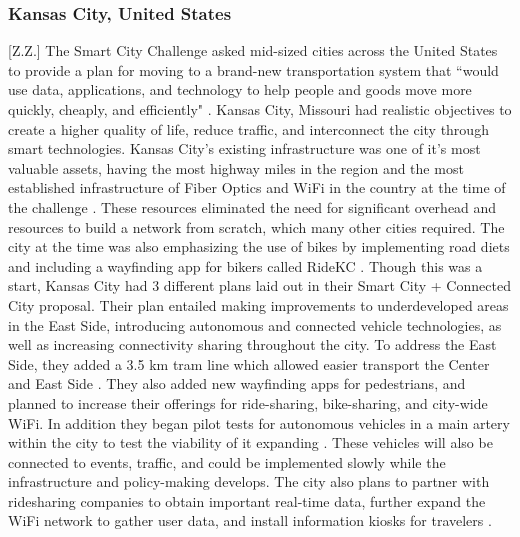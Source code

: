 \documentclass[12pt]{article}                       %
\begin{document}
\subsubsection{Kansas City, United States}[Z.Z.]
The Smart City Challenge asked mid-sized cities across the United States to provide a plan for moving to a brand-new transportation system that “would use data, applications, and technology to help people and goods move more quickly, cheaply, and efficiently" \cite{2016BeyondChallengeb}. Kansas City, Missouri had realistic objectives to create a higher quality of life, reduce traffic, and interconnect the city through smart technologies. Kansas City's existing infrastructure was one of it's most valuable assets, having the most highway miles in the region and the most established infrastructure of Fiber Optics and WiFi in the country at the time of the challenge \cite{2016BeyondChallengeb}. These resources eliminated the need for significant overhead and resources to build a network from scratch, which many other cities required. The city at the time was also emphasizing the use of bikes by implementing road diets and including a wayfinding app for bikers called RideKC \cite{2016BeyondChallengeb}. Though this was a start, Kansas City had 3 different plans laid out in their Smart City + Connected City proposal. Their plan entailed making improvements to underdeveloped areas in the East Side, introducing autonomous and connected vehicle technologies, as well as increasing connectivity sharing throughout the city. To address the East Side, they added a 3.5 km tram line which allowed easier transport the Center and East Side \cite{2016BeyondChallengeb}. They also added new wayfinding apps for pedestrians, and planned to increase their offerings for ride-sharing, bike-sharing, and city-wide WiFi. In addition they began pilot tests for autonomous vehicles in a main artery within the city to test the viability of it expanding \cite{2016BeyondChallengeb}. These vehicles will also be connected to events, traffic, and could be implemented slowly while the infrastructure and policy-making develops. The city also plans to partner with ridesharing companies to obtain important real-time data, further expand the WiFi network to gather user data, and install information kiosks for travelers \cite{2016BeyondChallengeb}.
\end{document}
